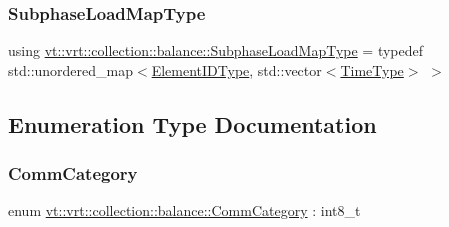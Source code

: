 \mbox{\label{namespacevt_1_1vrt_1_1collection_1_1balance_a3d91523158c1025b7b665240072f3b7e}} 
\subsubsection{\texorpdfstring{Subphase\+Load\+Map\+Type}{SubphaseLoadMapType}}
{\footnotesize\ttfamily using \hyperlink{namespacevt_1_1vrt_1_1collection_1_1balance_a3d91523158c1025b7b665240072f3b7e}{vt\+::vrt\+::collection\+::balance\+::\+Subphase\+Load\+Map\+Type} = typedef std\+::unordered\+\_\+map$<$\hyperlink{namespacevt_1_1vrt_1_1collection_1_1balance_a14c8d2c972f2913aa3f1636e5be0a120}{Element\+I\+D\+Type}, std\+::vector$<$\hyperlink{namespacevt_a876a9d0cd5a952859c72de8a46881442}{Time\+Type}$>$ $>$}



\subsection{Enumeration Type Documentation}
\mbox{\label{namespacevt_1_1vrt_1_1collection_1_1balance_a9cc6c6884ca0416dae824e9204093c57}} 
\subsubsection{\texorpdfstring{Comm\+Category}{CommCategory}}
{\footnotesize\ttfamily enum \hyperlink{namespacevt_1_1vrt_1_1collection_1_1balance_a9cc6c6884ca0416dae824e9204093c57}{vt\+::vrt\+::collection\+::balance\+::\+Comm\+Category} \+: int8\+\_\+t\hspace{0.3cm}{\ttfamily [strong]}}

